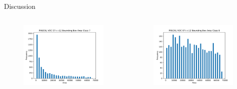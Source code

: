 \begin{frame}{Discussion}{}
\begin{columns}
        \begin{figure}
            \includegraphics[width=1.0 \textwidth]{figs/trainvalhist_class7.pdf}
        \end{figure}
        \begin{figure}
            \includegraphics[width=1.0 \textwidth]{figs/trainvalhist_class8.pdf}
        \end{figure}
    \end{columns}
\end{frame}

